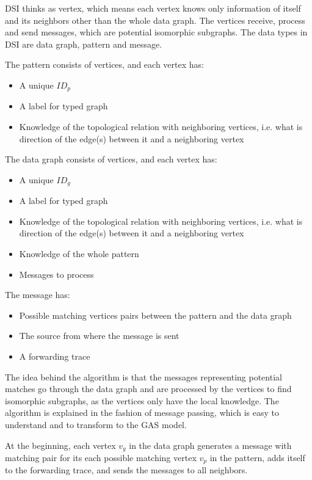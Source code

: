 DSI thinks as vertex, which means each vertex knows only information of itself and its neighbors other than the whole data graph. The vertices receive, process and send messages, which are potential isomorphic subgraphs. The data types in DSI are data graph, pattern and message.

The pattern consists of vertices, and each vertex has:	
	\begin{itemize}
	\item A unique $ID_p$
	\item A label for typed graph
	\item Knowledge of the topological relation with neighboring vertices, i.e. what is direction of the edge(s) between it and a neighboring vertex
	\end{itemize}
The data graph consists of vertices, and each vertex has:
	\begin{itemize}
	\item A unique $ID_g$
	\item A label for typed graph
	\item Knowledge of the topological relation with neighboring vertices, i.e. what is direction of the edge(s) between it and a neighboring vertex
	\item Knowledge of the whole pattern
	\item Messages to process
	\end{itemize}	
The message has:
	\begin{itemize}
	\item Possible matching vertices pairs between the pattern and the data graph
	\item The source from where the message is sent
	\item A forwarding trace
	\end{itemize}

The idea behind the algorithm is that the messages representing potential matches go through the data graph and are processed by the vertices to find isomorphic subgraphs, as the vertices only have the local knowledge. The algorithm is explained in the fashion of message passing, which is easy to understand and to transform to the GAS model.

At the beginning, each vertex $v_g$ in the data graph generates a message with matching pair for its each possible matching vertex $v_p$ in the pattern, adds itself to the forwarding trace, and sends the messages to all neighbors.

